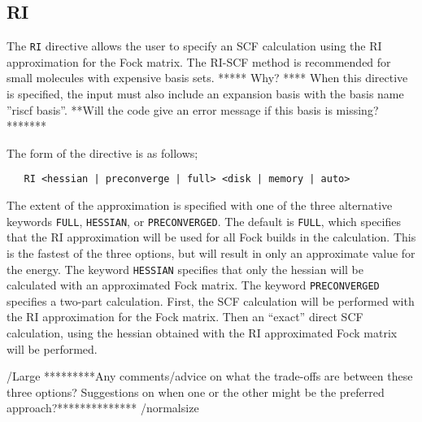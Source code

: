 \subsection{RI}

The \verb+RI+ directive allows the user to specify an SCF calculation
using the RI approximation for the Fock matrix.  The RI-SCF method is
recommended for small molecules with expensive basis sets.
\Large
***** Why? ****
\normalsize
When this directive is specified, the input must also include an expansion
basis with the basis name ''riscf basis''.
\Large
**Will the code give an error message if this basis is missing?*******
\normalsize

The form of the directive is as follows;

\begin{verbatim}
   RI <hessian | preconverge | full> <disk | memory | auto>
\end{verbatim}


The extent of the approximation is specified with one of the three
alternative keywords \verb+FULL+, \verb+HESSIAN+, or \verb+PRECONVERGED+.
The default is \verb+FULL+, which specifies that the RI approximation will
be used for all Fock builds in the calculation.  This is the fastest of
the three options, but will result in only an approximate value for the
energy.  The keyword \verb+HESSIAN+ specifies that only the hessian will
be calculated with an approximated Fock matrix.  The keyword 
\verb+PRECONVERGED+ specifies a two-part calculation.  First, the SCF
calculation will be performed with the RI approximation for the Fock
matrix.  Then an ``exact'' direct SCF calculation, using the hessian obtained
with the RI approximated Fock matrix will be performed.

/Large
*********Any comments/advice on what the trade-offs are between these
three options?  Suggestions on when one or the other might be the preferred
approach?**************
/normalsize


